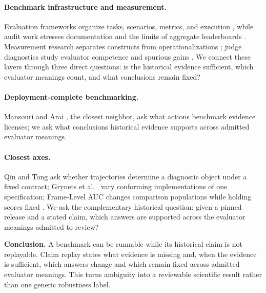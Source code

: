 \documentclass{article}
\begin{document}
\paragraph{Benchmark infrastructure and measurement.}
Evaluation frameworks organize tasks, scenarios, metrics, and execution \citep{Liang2022HELM,Kiela2021Dynabench,Ribeiro2020CheckList}, while audit work stresses documentation and the limits of aggregate leaderboards \citep{Raji2021EverythingBenchmark,Bowman2021FixBenchmarking,Ethayarajh2020UtilityLeaderboards}.  Measurement research separates constructs from operationalizations \citep{Jacobs2021MeasurementFairness,Bean2025ConstructValidity,SalaudeenEtAl2025MeasurementMeaning}; judge diagnostics study evaluator competence and spurious gains \citep{ChenEtAl2026JudgeCompetence,XuEtAl2026PhantomGains,MahmudEtAl2026JaggedFrontier}.  We connect these layers through three direct questions: is the historical evidence sufficient, which evaluator meanings count, and what conclusions remain fixed?

\paragraph{Deployment-complete benchmarking.}
Mansouri and Arai \citeyearpar{MansouriArai2026DeploymentComplete}, the closest neighbor, ask what actions benchmark evidence licenses; we ask what conclusions historical evidence supports across admitted evaluator meanings.

\paragraph{Closest axes.}
Qin and Tong \citeyearpar{QinTong2026Observability} ask whether trajectories determine a diagnostic object under a fixed contract; Grynets et al.\ \citeyearpar{GrynetsEtAl2026SpecificationDetermines} vary conforming implementations of one specification; Frame-Level AUC changes comparison populations while holding scores fixed \citep{Abdulaziz2026FrameAUC}.  We ask the complementary historical question: given a pinned release and a stated claim, which answers are supported across the evaluator meanings admitted to review?

\noindent\textbf{Conclusion.}
A benchmark can be runnable while its historical claim is not replayable.  Claim replay states what evidence is missing and, when the evidence is sufficient, which answers change and which remain fixed across admitted evaluator meanings.  This turns ambiguity into a reviewable scientific result rather than one generic robustness label.
\end{document}
